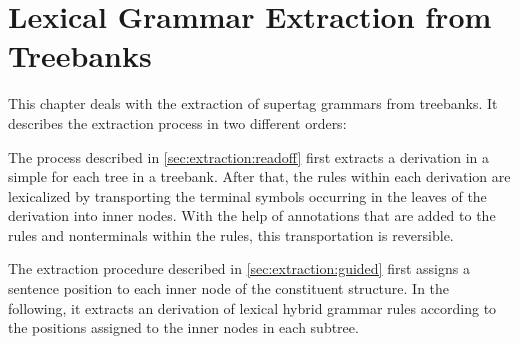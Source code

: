 \documentclass[../document.tex]{subfiles}
\begin{document}
    \chapter{Lexical Grammar Extraction from Treebanks}
    This chapter deals with the extraction of supertag grammars from treebanks.
    It describes the extraction process in two different orders:
    \begin{compactenum}
        \item
            The process described in \cref{sec:extraction:readoff} first extracts a derivation in a simple  for each tree in a treebank.
            After that, the rules within each derivation are lexicalized by transporting the terminal symbols occurring in the leaves of the derivation into inner nodes.
            With the help of annotations that are added to the rules and nonterminals within the rules, this transportation is reversible.
        \item
            The extraction procedure described in \cref{sec:extraction:guided} first assigns a sentence position to each inner node of the constituent structure.
            In the following, it extracts an  derivation of lexical hybrid grammar rules according to the positions assigned to the inner nodes in each subtree.
    \end{compactenum}

\end{document}
